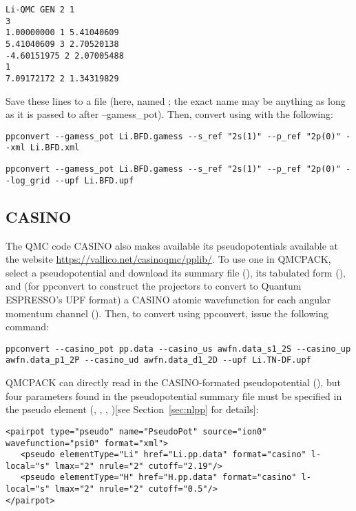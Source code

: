\begin{lstlisting}[style=GAMESS,caption=BFD Li pseudopotential in GAMESS format]
Li-QMC GEN 2 1
3
1.00000000 1 5.41040609
5.41040609 3 2.70520138
-4.60151975 2 2.07005488
1
7.09172172 2 1.34319829
\end{lstlisting}
Save these lines to a file (here, named ; the exact name may be anything as long as it is passed to  after --gamess\_pot).  Then, convert using  with the following:
\begin{lstlisting}[style=SHELL,caption=Convert GAMESS-formatted pseudopotential to FSAtom xml format]
  ppconvert --gamess_pot Li.BFD.gamess --s_ref "2s(1)" --p_ref "2p(0)" --xml Li.BFD.xml
\end{lstlisting}
\begin{lstlisting}[style=SHELL,caption=Convert GAMESS-formatted pseudopotential to Quantum ESPRESSO UPF format]
  ppconvert --gamess_pot Li.BFD.gamess --s_ref "2s(1)" --p_ref "2p(0)" --log_grid --upf Li.BFD.upf
\end{lstlisting}

\subsection{CASINO}
\label{subsec:CASINO}
The QMC code CASINO also makes available its pseudopotentials available at the website \url{https://vallico.net/casinoqmc/pplib/}. To use one in QMCPACK, select a pseudopotential and download its summary file (), its tabulated form (), and (for ppconvert to construct the projectors to convert to Quantum ESPRESSO's UPF format) a CASINO atomic wavefunction for each angular momentum channel ().  Then, to convert using ppconvert, issue the following command:
\begin{lstlisting}[style=SHELL,caption=Convert CASINO-formatted pseudopotential to Quantum ESPRESSO UPF format]
ppconvert --casino_pot pp.data --casino_us awfn.data_s1_2S --casino_up awfn.data_p1_2P --casino_ud awfn.data_d1_2D --upf Li.TN-DF.upf
\end{lstlisting}
QMCPACK can directly read in the CASINO-formated pseudopotential (), but four parameters found in the pseudopotential summary file must be specified in the pseudo element (, , , )[see Section~\ref{sec:nlpp} for details]:
\begin{lstlisting}[style=QMCPXML,caption=XML syntax to use CASINO-formatted pseudopotentials in QMCPACK]
<pairpot type="pseudo" name="PseudoPot" source="ion0" wavefunction="psi0" format="xml">
   <pseudo elementType="Li" href="Li.pp.data" format="casino" l-local="s" lmax="2" nrule="2" cutoff="2.19"/>
   <pseudo elementType="H" href="H.pp.data" format="casino" l-local="s" lmax="2" nrule="2" cutoff="0.5"/>
</pairpot>
\end{lstlisting}
